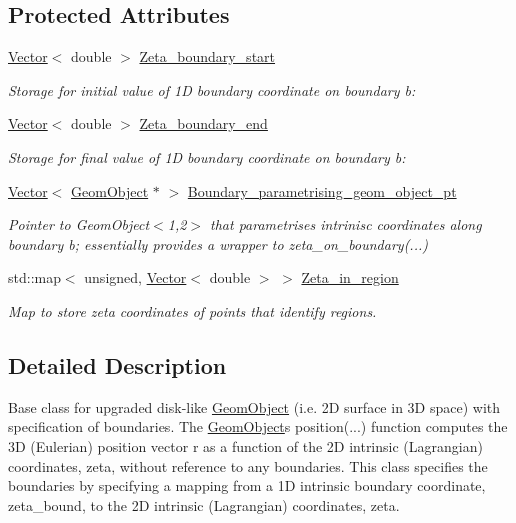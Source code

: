 \subsection*{Protected Attributes}
\begin{DoxyCompactItemize}
\item 
\hyperlink{classoomph_1_1Vector}{Vector}$<$ double $>$ \hyperlink{classoomph_1_1DiskLikeGeomObjectWithBoundaries_a2d999734b8e0ddc2789ac1a9d18f5b68}{Zeta\+\_\+boundary\+\_\+start}
\begin{DoxyCompactList}\small\item\em Storage for initial value of 1D boundary coordinate on boundary b\+: \end{DoxyCompactList}\item 
\hyperlink{classoomph_1_1Vector}{Vector}$<$ double $>$ \hyperlink{classoomph_1_1DiskLikeGeomObjectWithBoundaries_af8de15d74e41b124f488fc1c3823ba7f}{Zeta\+\_\+boundary\+\_\+end}
\begin{DoxyCompactList}\small\item\em Storage for final value of 1D boundary coordinate on boundary b\+: \end{DoxyCompactList}\item 
\hyperlink{classoomph_1_1Vector}{Vector}$<$ \hyperlink{classoomph_1_1GeomObject}{Geom\+Object} $\ast$ $>$ \hyperlink{classoomph_1_1DiskLikeGeomObjectWithBoundaries_aa1de5b0b7af8d20c3675ae9b4b6f2e12}{Boundary\+\_\+parametrising\+\_\+geom\+\_\+object\+\_\+pt}
\begin{DoxyCompactList}\small\item\em Pointer to Geom\+Object$<$1,2$>$ that parametrises intrinisc coordinates along boundary b; essentially provides a wrapper to zeta\+\_\+on\+\_\+boundary(...) \end{DoxyCompactList}\item 
std\+::map$<$ unsigned, \hyperlink{classoomph_1_1Vector}{Vector}$<$ double $>$ $>$ \hyperlink{classoomph_1_1DiskLikeGeomObjectWithBoundaries_a915c63839a2156913cfcbcd59a0cd251}{Zeta\+\_\+in\+\_\+region}
\begin{DoxyCompactList}\small\item\em Map to store zeta coordinates of points that identify regions. \end{DoxyCompactList}\end{DoxyCompactItemize}


\subsection{Detailed Description}
Base class for upgraded disk-\/like \hyperlink{classoomph_1_1GeomObject}{Geom\+Object} (i.\+e. 2D surface in 3D space) with specification of boundaries. The \hyperlink{classoomph_1_1GeomObject}{Geom\+Object}\textquotesingle{}s position(...) function computes the 3D (Eulerian) position vector r as a function of the 2D intrinsic (Lagrangian) coordinates, zeta, without reference to any boundaries. This class specifies the boundaries by specifying a mapping from a 1D intrinsic boundary coordinate, zeta\+\_\+bound, to the 2D intrinsic (Lagrangian) coordinates, zeta.

